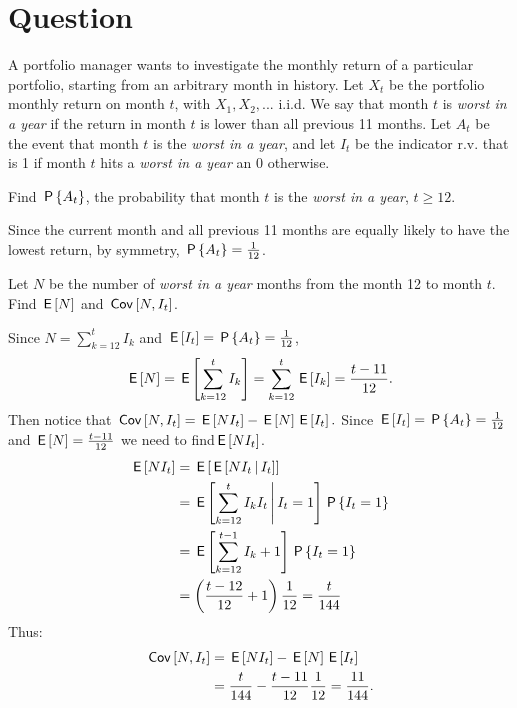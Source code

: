 \section*{Question}

A portfolio manager wants to investigate the monthly return of a particular portfolio, starting from an arbitrary month in history.  Let $X_t$ be the portfolio monthly return on month $t$, with $X_1, X_2, . . . $ i.i.d. We say that month $t$ is  \textit{worst in a year} if the return in month $t$ is lower than all previous 11 months. Let $A_t$ be the event that month $t$ is the \textit{worst in a year}, and let $I_{t}$ be the indicator r.v. that is 1 if month $t$ hits a \textit{worst in a year} an 0 otherwise.

\begin{exercise}[0.5]
Find $\P{A_t}$, the probability that month $t$ is the \textit{worst in a year}, $t\geq 12$.
\begin{solution}
 Since the current month and all previous 11 months are equally likely to have the lowest return, by symmetry, $\P{A_t}=\frac{1}{12}$.
\end{solution}
\end{exercise}


\begin{exercise}[2]
 Let $N$ be the number of \textit{worst in a year} months from the month 12 to month $t$. Find $\E{N}$ and $\cov{N, I_t}$.
\begin{solution}
  Since $N=\sum_{k=12}^t I_k$ and $\E{I_t}=\P{A_t}=\frac{1}{12}$, $$\E{N}=\E{\sum_{k=12}^t I_k}=\sum_{k=12}^t \E{I_k}=\frac{t-11}{12}.$$
    Then notice that $\cov{N, I_t}=\E{NI_t}-\E{N}\E{I_t}.$ Since $\E{I_t}=\P{A_t}=\frac{1}{12}$ and $\E{N}=\frac{t-11}{12}$ we need to find$\E{NI_t}$.
     \begin{align*}
        \E{NI_t}&=\E{\E{NI_t \given I_t}}\\
        &=\E{\sum_{k=12}^t I_k I_t \given I_t=1}\P{I_t=1} \\
         &=\E{\sum_{k=12}^{t-1} I_k+1} \P{I_t=1}\\
         &=\left(\frac{t-12}{12}+1\right)\frac{1}{12} =\frac{t}{144}
    \end{align*}
    Thus:
    \begin{align*}
        \cov{N, I_t}&=\E{NI_t}-\E{N}\E{I_t}\\
        &=\frac{t}{144}-\frac{t-11}{12}\frac{1}{12} =\frac{11}{144}.
    \end{align*}
\end{solution}
\end{exercise}


